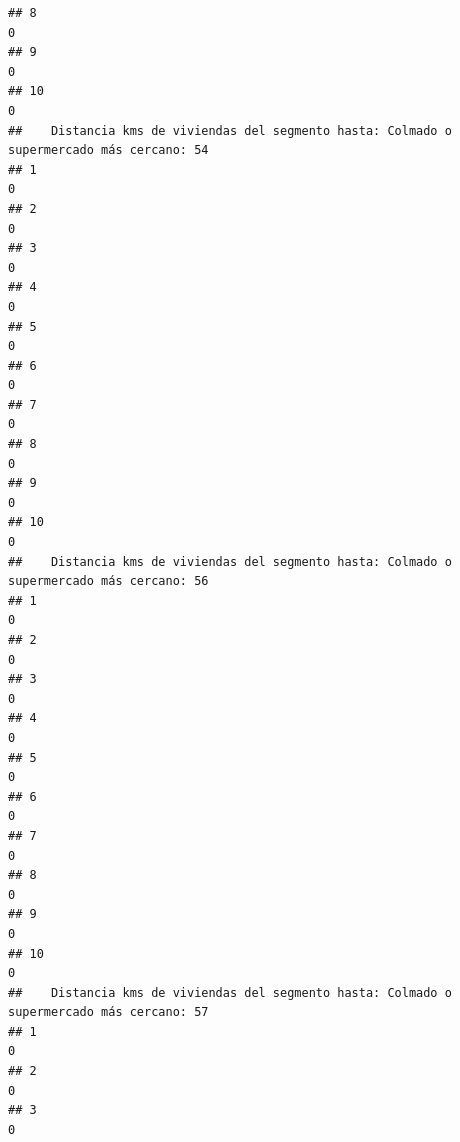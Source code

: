\documentclass[11pt,]{article}
\begin{document}
\begin{verbatim}
## 8                                                                                      0
## 9                                                                                      0
## 10                                                                                     0
##    Distancia kms de viviendas del segmento hasta: Colmado o supermercado más cercano: 54
## 1                                                                                      0
## 2                                                                                      0
## 3                                                                                      0
## 4                                                                                      0
## 5                                                                                      0
## 6                                                                                      0
## 7                                                                                      0
## 8                                                                                      0
## 9                                                                                      0
## 10                                                                                     0
##    Distancia kms de viviendas del segmento hasta: Colmado o supermercado más cercano: 56
## 1                                                                                      0
## 2                                                                                      0
## 3                                                                                      0
## 4                                                                                      0
## 5                                                                                      0
## 6                                                                                      0
## 7                                                                                      0
## 8                                                                                      0
## 9                                                                                      0
## 10                                                                                     0
##    Distancia kms de viviendas del segmento hasta: Colmado o supermercado más cercano: 57
## 1                                                                                      0
## 2                                                                                      0
## 3                                                                                      0

\end{verbatim}
\end{document}
